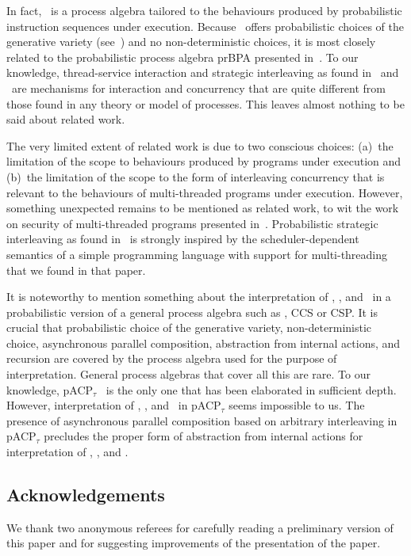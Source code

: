 \documentclass{llncs}
\begin{document}
In fact, \prBTA\ is a process algebra tailored to the behaviours 
produced by probabilistic instruction sequences under execution.
Because \prBTA\ offers probabilistic choices of the generative variety 
(see~\cite{GSS95a}) and no non-deterministic choices, it is most closely 
related to the probabilistic process algebra prBPA presented 
in~\cite{BBS95a}.
To our knowledge, thread-service interaction and strategic interleaving 
as found in \prTSI\ and \prTA\ are mechanisms for interaction and 
concurrency that are quite different from those found in any theory or 
model of processes.
This leaves almost nothing to be said about related work.

The very limited extent of related work is due to two conscious choices:
(a)~the limitation of the scope to behaviours produced by programs under 
execution and
(b)~the limitation of the scope to the form of interleaving concurrency 
that is relevant to the behaviours of multi-threaded programs under 
execution.
However, something unexpected remains to be mentioned as related work, 
to wit the work on security of multi-threaded programs presented 
in~\cite{SS00a}.
Probabilistic strategic interleaving as found in \prTA\ is strongly 
inspired by the scheduler-dependent semantics of a simple programming 
language with support for multi-threading that we found in that paper.

It is noteworthy to mention something about the interpretation of 
\prBTA, \prTSI, and \prTA\ in a probabilistic version of a general 
process algebra such as \ACP, CCS or CSP.
It is crucial that probabilistic choice of the generative variety, 
non-deterministic choice, asynchronous parallel composition, abstraction 
from internal actions, and recursion are covered by the process algebra
used for the purpose of interpretation.
General process algebras that cover all this are rare.
To our knowledge, pACP$_\tau$~\cite{AG09a} is the only one that has been 
elaborated in sufficient depth.
However, interpretation of \prBTA, \prTSI, and \prTA\ in pACP$_\tau$ 
seems impossible to us.
The presence of asynchronous parallel composition based on arbitrary 
interleaving in pACP$_\tau$ precludes the proper form of abstraction 
from internal actions for interpretation of \prBTA, \prTSI, and \prTA. 

\subsection*{Acknowledgements}

We thank two anonymous referees for carefully reading a preliminary
version of this paper and for suggesting improvements of the
presentation of the paper.
\end{document}
